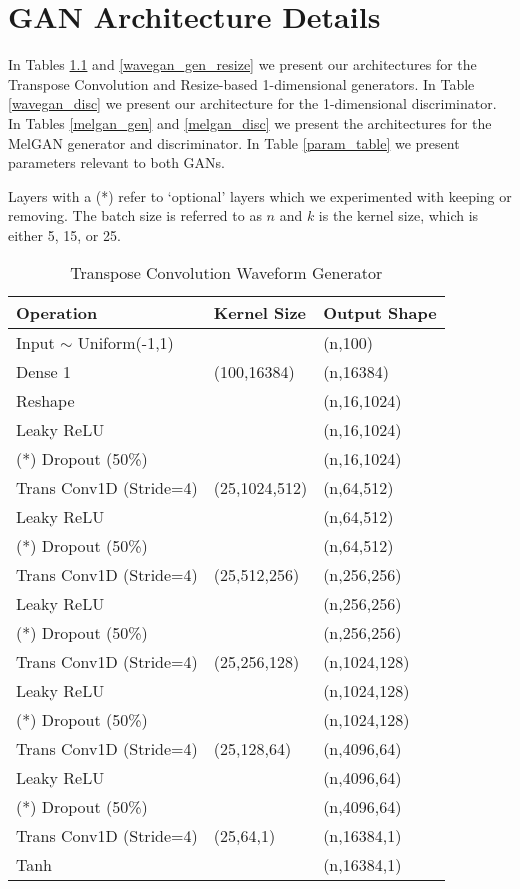 \chapter{GAN Architecture Details}

In Tables \ref{wavegan_gen} and \ref{wavegan_gen_resize} we present our architectures for the Transpose Convolution and Resize-based 1-dimensional generators. In Table \ref{wavegan_disc} we present our architecture for the 1-dimensional discriminator. In Tables \ref{melgan_gen} and \ref{melgan_disc} we present the architectures for the MelGAN generator and discriminator. In Table \ref{param_table} we present parameters relevant to both GANs.

Layers with a (*) refer to `optional' layers which we experimented with keeping or removing. The batch size is referred to as $n$ and $k$ is the kernel size, which is either 5, 15, or 25.

\begin{table}[h]
\caption{Transpose Convolution Waveform Generator}\label{wavegan_gen}
\centering
\begin{tabular}{l|l|l}
Operation & Kernel Size & Output Shape \\ \hline
Input $\sim$ Uniform(-1,1) & \  & (n,100)\\
Dense 1 & (100,16384) & (n,16384)\\
Reshape & \ & (n,16,1024)\\
Leaky ReLU & \ & (n,16,1024)\\
(*) Dropout (50\%) & \ & (n,16,1024)\\
Trans Conv1D (Stride=4) & (25,1024,512) & (n,64,512)\\
Leaky ReLU & \  & (n,64,512)\\
(*) Dropout (50\%) & \  & (n,64,512)\\
Trans Conv1D (Stride=4) & (25,512,256) & (n,256,256)\\
Leaky ReLU & \  & (n,256,256)\\
(*) Dropout (50\%) & \  & (n,256,256)\\
Trans Conv1D (Stride=4) & (25,256,128) & (n,1024,128)\\
Leaky ReLU & \  & (n,1024,128)\\
(*) Dropout (50\%) & \  & (n,1024,128)\\
Trans Conv1D (Stride=4) & (25,128,64) & (n,4096,64)\\
Leaky ReLU & \  & (n,4096,64)\\
(*) Dropout (50\%) & \  & (n,4096,64)\\
Trans Conv1D (Stride=4) & (25,64,1) & (n,16384,1)\\
Tanh & \  & (n,16384,1)\\
\end{tabular}
\end{table}

